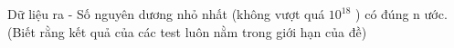 Dữ liệu ra
- Số nguyên dương nhỏ nhất (không vượt quá $10^{18}$   ) có đúng n ước.   
\\   (Biết rằng kết quả của các test luôn nằm trong giới hạn của đề)